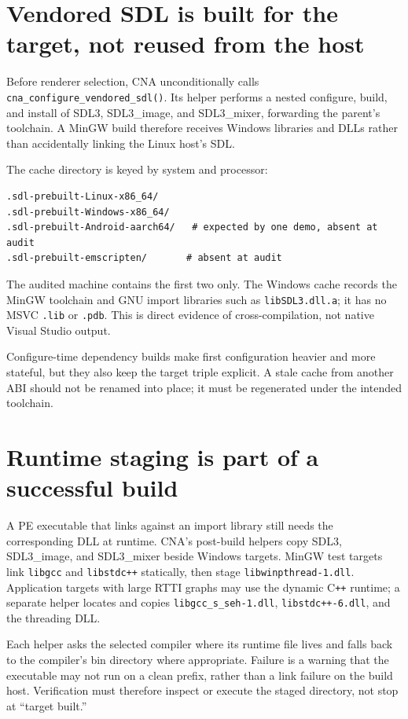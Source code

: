 \section{Vendored SDL is built for the target, not reused from the host}

Before renderer selection, CNA unconditionally calls \texttt{cna\_configure\_vendored\_sdl()}.
Its helper performs a nested configure, build, and install of SDL3, SDL3\_image, and
SDL3\_mixer, forwarding the parent's toolchain. A MinGW build therefore receives Windows
libraries and DLLs rather than accidentally linking the Linux host's SDL.

The cache directory is keyed by system and processor:

\begin{lstlisting}
.sdl-prebuilt-Linux-x86_64/
.sdl-prebuilt-Windows-x86_64/
.sdl-prebuilt-Android-aarch64/   # expected by one demo, absent at audit
.sdl-prebuilt-emscripten/       # absent at audit
\end{lstlisting}

The audited machine contains the first two only. The Windows cache records the MinGW toolchain
and GNU import libraries such as \texttt{libSDL3.dll.a}; it has no MSVC \texttt{.lib} or
\texttt{.pdb}. This is direct evidence of cross-compilation, not native Visual Studio output.

Configure-time dependency builds make first configuration heavier and more stateful, but they
also keep the target triple explicit. A stale cache from another ABI should not be renamed into
place; it must be regenerated under the intended toolchain.

\section{Runtime staging is part of a successful build}

A PE executable that links against an import library still needs the corresponding DLL at
runtime. CNA's post-build helpers copy SDL3, SDL3\_image, and SDL3\_mixer beside Windows
targets. MinGW test targets link \texttt{libgcc} and \texttt{libstdc++} statically, then stage
\texttt{libwinpthread-1.dll}. Application targets with large RTTI graphs may use the dynamic
C\texttt{++} runtime; a separate helper locates and copies
\texttt{libgcc\_s\_seh-1.dll}, \texttt{libstdc++-6.dll}, and the threading DLL.

Each helper asks the selected compiler where its runtime file lives and falls back to the
compiler's bin directory where appropriate. Failure is a warning that the executable may not
run on a clean prefix, rather than a link failure on the build host. Verification must therefore
inspect or execute the staged directory, not stop at ``target built.''


